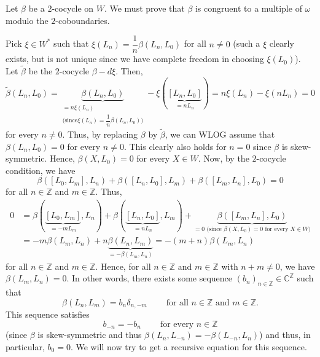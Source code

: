 \documentclass
[numbers=enddot,12pt,final,onecolumn,german,notitlepage]{scrartcl}%
\theoremstyle{definition}
\begin{document}
Let $\beta$ be a $2$-cocycle on $W$. We must prove that $\beta$ is congruent
to a multiple of $\omega$ modulo the $2$-coboundaries.

Pick $\xi\in W^{\ast}$ such that $\xi\left(  L_{n}\right)  =\dfrac{1}{n}%
\beta\left(  L_{n},L_{0}\right)  $ for all $n\neq0$ (such a $\xi$ clearly
exists, but is not unique since we have complete freedom in choosing
$\xi\left(  L_{0}\right)  $). Let $\widetilde{\beta}$ be the $2$-cocycle
$\beta-d\xi$. Then,
\[
\widetilde{\beta}\left(  L_{n},L_{0}\right)  =\underbrace{\beta\left(
L_{n},L_{0}\right)  }_{\substack{=n\xi\left(  L_{n}\right)  \\\text{(since
}\xi\left(  L_{n}\right)  =\dfrac{1}{n}\beta\left(  L_{n},L_{0}\right)
\text{)}}}-\xi\left(  \underbrace{\left[  L_{n},L_{0}\right]  }_{=nL_{n}%
}\right)  =n\xi\left(  L_{n}\right)  -\xi\left(  nL_{n}\right)  =0
\]
for every $n\neq0$. Thus, by replacing $\beta$ by $\widetilde{\beta}$, we can
WLOG assume that $\beta\left(  L_{n},L_{0}\right)  =0$ for every $n\neq0$.
This clearly also holds for $n=0$ since $\beta$ is skew-symmetric. Hence,
$\beta\left(  X,L_{0}\right)  =0$ for every $X\in W$. Now, by the $2$-cocycle
condition, we have%
\[
\beta\left(  \left[  L_{0},L_{m}\right]  ,L_{n}\right)  +\beta\left(  \left[
L_{n},L_{0}\right]  ,L_{m}\right)  +\beta\left(  \left[  L_{m},L_{n}\right]
,L_{0}\right)  =0
\]
for all $n\in\mathbb{Z}$ and $m\in\mathbb{Z}$. Thus,%
\begin{align*}
0  &  =\beta\left(  \underbrace{\left[  L_{0},L_{m}\right]  }_{=-mL_{m}}%
,L_{n}\right)  +\beta\left(  \underbrace{\left[  L_{n},L_{0}\right]
}_{=nL_{n}},L_{m}\right)  +\underbrace{\beta\left(  \left[  L_{m}%
,L_{n}\right]  ,L_{0}\right)  }_{=0\text{ (since }\beta\left(  X,L_{0}\right)
=0\text{ for every }X\in W\text{)}}\\
&  =-m\beta\left(  L_{m},L_{n}\right)  +n\underbrace{\beta\left(  L_{n}%
,L_{m}\right)  }_{=-\beta\left(  L_{m},L_{n}\right)  }=-\left(  m+n\right)
\beta\left(  L_{m},L_{n}\right)
\end{align*}
for all $n\in\mathbb{Z}$ and $m\in\mathbb{Z}$. Hence, for all $n\in\mathbb{Z}$
and $m\in\mathbb{Z}$ with $n+m\neq0$, we have $\beta\left(  L_{m}%
,L_{n}\right)  =0$. In other words, there exists some sequence $\left(
b_{n}\right)  _{n\in\mathbb{Z}}\in\mathbb{C}^{\mathbb{Z}}$ such that
\begin{equation}
\beta\left(  L_{n},L_{m}\right)  =b_{n}\delta_{n,-m}%
\ \ \ \ \ \ \ \ \ \ \text{for all }n\in\mathbb{Z}\text{ and }m\in\mathbb{Z}.
\label{thm.H^2(W).pf.2}%
\end{equation}
This sequence satisfies
\begin{equation}
b_{-n}=-b_{n}\ \ \ \ \ \ \ \ \ \ \text{for every }n\in\mathbb{Z}
\label{thm.H^2(W).pf.1}%
\end{equation}
(since $\beta$ is skew-symmetric and thus $\beta\left(  L_{n},L_{-n}\right)
=-\beta\left(  L_{-n},L_{n}\right)  $) and thus, in particular, $b_{0}=0$. We
will now try to get a recursive equation for this sequence.
\end{document}
